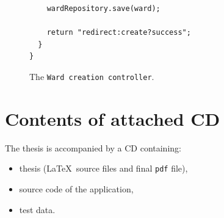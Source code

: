 \documentclass[a4paper,twoside,12pt]{book}
\begin{document}
\begin{appendices}
\begin{figure}
\begin{lstlisting}
    wardRepository.save(ward);
              
    return "redirect:create?success";
  }
}
    \end{lstlisting}
    \caption{The \lstinline|Ward creation controller|.}
    \label{fig:ward_creation_controller}
  \end{figure}

\chapter*{Contents of attached CD}

The thesis is accompanied by a CD containing:
\begin{itemize}
\item thesis (\LaTeX\ source files and final \texttt{pdf} file),
\item source code of the application,
\item test data.
\end{itemize}
 

\listoffigures
\listoftables
	
\end{appendices}
\end{document}
